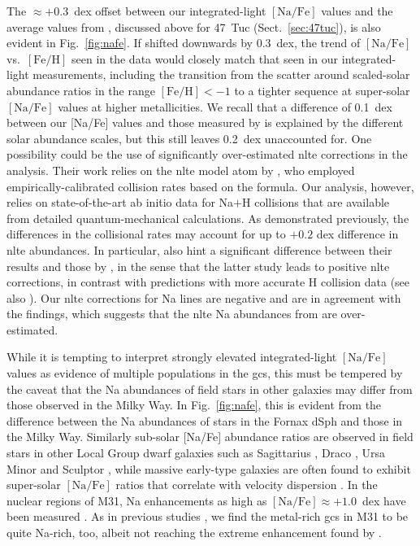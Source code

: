 \documentclass{aa}
\begin{document}
The $\approx+0.3$~dex offset between our integrated-light $\mathrm{[Na/Fe]}$ values and the average values from , discussed above for 47~Tuc (Sect.~\ref{sec:47tuc}), is also evident in Fig.~\ref{fig:nafe}. If shifted downwards by 0.3~dex, the trend of $\mathrm{[Na/Fe]}$ vs.\ $\mathrm{[Fe/H]}$ seen in the  data would closely match that seen in our integrated-light measurements, including the transition from the scatter around scaled-solar abundance ratios in the range $\mathrm{[Fe/H]}<-1$ to a tighter sequence at super-solar $\mathrm{[Na/Fe]}$ values at higher metallicities.
We recall that a difference of 0.1~dex between our [Na/Fe] values and those measured by  is explained by the different solar abundance scales, but this still leaves 0.2~dex unaccounted for. One possibility could be the use of significantly over-estimated \ac{nlte} corrections in the  analysis. Their work relies on the \ac{nlte} model atom by \citet{Gratton1999}, who employed empirically-calibrated collision rates based on the \citet{Drawin1965} formula. Our analysis, however, relies on state-of-the-art ab initio data for Na$+$H collisions that are available from detailed quantum-mechanical calculations. As \citet{Lind2011} demonstrated previously, the differences in the collisional rates may account for up to $+0.2$ dex difference in \ac{nlte} abundances. In particular,  \citet{Lind2011} also hint a significant difference between their results and those by \citet{Gratton1999}, in the sense that the latter study leads to positive \ac{nlte} corrections, in contrast with predictions with more accurate H collision data (see also \citealt{Asplund2005}). Our \ac{nlte} corrections for Na lines are negative and are in agreement with the \citet{Lind2011} findings, which suggests that the \ac{nlte} Na abundances from  are over-estimated.

While it is tempting to interpret strongly elevated integrated-light $\mathrm{[Na/Fe]}$ values as evidence of multiple populations in the \acp{gc}, this must be tempered by the caveat that the Na abundances of field stars in other galaxies may differ from those observed in the Milky Way. In Fig.~\ref{fig:nafe}, this is evident from the difference between the Na abundances of stars in the Fornax dSph and those in the Milky Way. Similarly sub-solar [Na/Fe] abundance ratios are observed in field stars in other Local Group dwarf galaxies such as Sagittarius \citep{Sbordone2007,Hasselquist2017},
Draco \citep{Cohen2009},
Ursa Minor \citep{Cohen2010} and 
Sculptor \citep{Salgado2019}, while massive early-type galaxies are often found to exhibit super-solar $\mathrm{[Na/Fe]}$ ratios that correlate with velocity dispersion \citep{Conroy2014,Worthey2014,LaBarbera2017}.
In the nuclear regions of M31, Na enhancements as high as $\mathrm{[Na/Fe]}\approx+1.0$~dex have been measured \citep{Conroy2012b}. 
As in previous studies \citep{Colucci2014,Sakari2016},  we find the metal-rich \acp{gc} in M31 to be quite Na-rich, too, albeit not reaching the extreme enhancement found by \citet{Conroy2012b}. 
\end{document}
